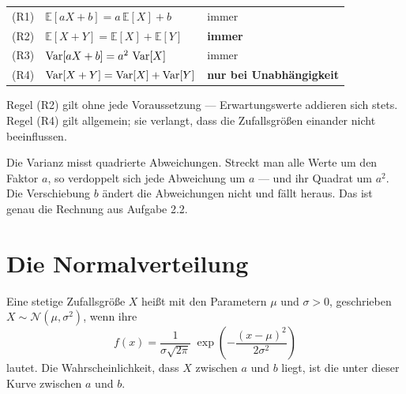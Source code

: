 \begin{merksatz}
\begin{center}
\renewcommand{\arraystretch}{1.6}
\begin{tabular}{@{}P{1.0cm}P{4.0cm}P{3.2cm}@{}}
\toprule
(R1) & $\mathbb{E}[aX+b] = a\,\mathbb{E}[X]+b$ & immer\\
(R2) & $\mathbb{E}[X+Y] = \mathbb{E}[X]+\mathbb{E}[Y]$ & \textbf{immer}\\
(R3) & $\operatorname{Var}[aX+b] = a^2\,\operatorname{Var}[X]$ & immer\\
(R4) & $\operatorname{Var}[X+Y] = \operatorname{Var}[X]+\operatorname{Var}[Y]$ & \textcolor{akzent}{\textbf{nur bei Unabhängigkeit}}\\
\bottomrule
\end{tabular}
\end{center}

Regel (R2) gilt ohne jede Voraussetzung --- Erwartungswerte addieren sich stets. Regel (R4) gilt  allgemein; sie verlangt, dass die Zufallsgrößen einander nicht beeinflussen.

\begin{center}
\begin{minipage}{0.88\textwidth}
\end{minipage}
\end{center}

Die Varianz misst quadrierte Abweichungen. Streckt man alle Werte um den Faktor $a$, so verdoppelt sich jede Abweichung um $a$ --- und ihr Quadrat um $a^2$. Die Verschiebung $b$ ändert die Abweichungen nicht und fällt heraus. Das ist genau die Rechnung aus Aufgabe 2.2.
\end{merksatz}

\section{Die Normalverteilung}

\begin{definition}
Eine stetige Zufallsgröße $X$ heißt  mit den Parametern $\mu$ und $\sigma > 0$, geschrieben $X \sim \mathcal{N}(\mu, \sigma^2)$, wenn ihre 
\[ f(x) = \frac{1}{\sigma\sqrt{2\pi}}\;\exp\!\left(-\frac{(x-\mu)^2}{2\sigma^2}\right) \]
lautet. Die Wahrscheinlichkeit, dass $X$ zwischen $a$ und $b$ liegt, ist die  unter dieser Kurve zwischen $a$ und $b$.
\end{definition}

